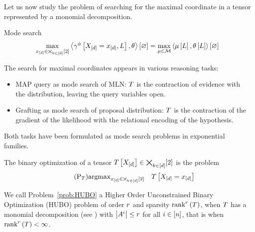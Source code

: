 
Let us now study the problem of searching for the maximal coordinate in a tensor represented by a monomial decomposition.



Mode search
\begin{align*}
    \max_{x_{[d]}\in\bigtimes_{k\in[d]}[2]} \left\langle \gamma^{\phi}\left[X_{[d]}=x_{[d]},L\right],\theta\right\rangle \left[ \varnothing \right]
    = \max_{\mu\in\mathcal{M}} \left\langle \mu\left[L\right],\theta\left[L\right]\right\rangle \left[ \varnothing \right]
\end{align*}


The search for maximal coordinates appears in various reasoning tasks:
\begin{itemize}
    \item MAP query as mode search of MLN: $T$ is the contraction of evidence with the distribution, leaving the query variables open.
    \item Grafting as mode search of proposal distribution: $T$ is the contraction of the gradient of the likelihood with the relational encoding of the hypothesis.
\end{itemize}
Both tasks have been formulated as mode search problems in exponential families.






\begin{definition}
    The binary optimization of a tensor $T\left[X_{[d]}\right]\in\bigtimes_{k\in[d]}[2]$ is the problem
    \begin{align}
        \tag{$\mathrm{P}_{\hypercore}$}\label{prob:HUBO}
        \argmax_{\shortcatindices\in\atomstates} \quad \hypercoreat{\indexedshortcatvariables}
    \end{align}

    We call Problem~\ref{prob:HUBO} a Higher Order Unconstrained Binary Optimization (HUBO) problem of order $r$ and sparsity $\mathrm{rank}^{r}\left(T\right)$, when $T$ has a monomial decomposition (see ) with $\left|A^{i}\right|\leq r$ for all $i\in[n]$, that is when $\mathrm{rank}^{r}\left(T\right)<\infty$.


\end{definition}


